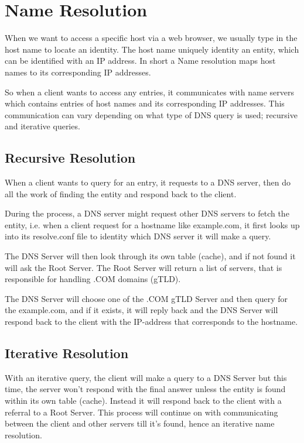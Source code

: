 \section{Name Resolution}

When we want to access a specific host via a web browser, we usually type in the host name to locate an identity. The host name uniquely identity an entity, which can be identified with an IP address. In short a Name resolution maps host names to its corresponding IP addresses.

So when a client wants to access any entries, it communicates with name servers which contains entries  of host names and its corresponding IP addresses. This communication can vary depending on what type of DNS query is used; recursive and iterative queries.

\subsection{Recursive Resolution}

When a client wants to query for an entry, it requests to a DNS server, then do all the work of finding the entity and respond back to the client.

During the process, a DNS server might request other DNS servers to fetch the entity, i.e. when a client request for a hostname like example.com, it first looks up into its resolve.conf file to identity which DNS server it will make a query.

The DNS Server will then look through its own table (cache), and if not found it will ask the Root Server. The Root Server will return a list of servers, that is responsible for handling .COM domains (gTLD).

The DNS Server will choose one of the .COM gTLD Server and then query for the example.com, and if it exists, it will reply back and the DNS Server will respond back to the client with the IP-address that corresponds to the hostname.

\subsection{Iterative Resolution}

With an iterative query, the client will make a query to a DNS Server but this time, the server won’t respond with the final answer unless the entity is found within its own table (cache). Instead it will respond back to the client with a referral to a Root Server. This process will continue on with communicating between the client and other servers till it’s found, hence an iterative name resolution.


